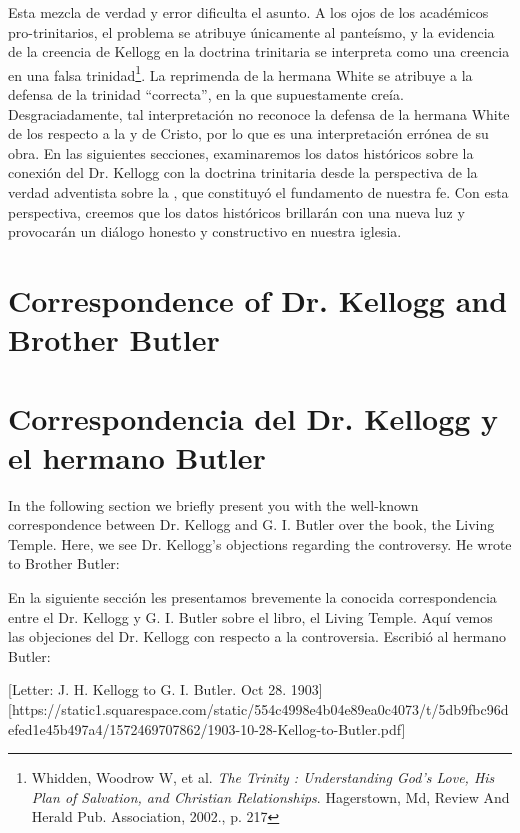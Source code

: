 Esta mezcla de verdad y error dificulta el asunto. A los ojos de los académicos pro-trinitarios, el problema se atribuye únicamente al panteísmo, y la evidencia de la creencia de Kellogg en la doctrina trinitaria se interpreta como una creencia en una falsa trinidad\footnote{Whidden, Woodrow W, et al. \textit{The Trinity : Understanding God's Love, His Plan of Salvation, and Christian Relationships}. Hagerstown, Md, Review And Herald Pub. Association, 2002., p. 217}. La reprimenda de la hermana White se atribuye a la defensa de la trinidad “correcta”, en la que supuestamente creía. Desgraciadamente, tal interpretación no reconoce la defensa de la hermana White de los  respecto a la  y de Cristo, por lo que es una interpretación errónea de su obra. En las siguientes secciones, examinaremos los datos históricos sobre la conexión del Dr. Kellogg con la doctrina trinitaria desde la perspectiva de la verdad adventista sobre la , que constituyó el fundamento de nuestra fe. Con esta perspectiva, creemos que los datos históricos brillarán con una nueva luz y provocarán un diálogo honesto y constructivo en nuestra iglesia.


\section*{Correspondence of Dr. Kellogg and Brother Butler}


\section*{Correspondencia del Dr. Kellogg y el hermano Butler}


In the following section we briefly present you with the well-known correspondence between Dr. Kellogg and G. I. Butler over the book, the Living Temple. Here, we see Dr. Kellogg’s objections regarding the controversy. He wrote to Brother Butler:


En la siguiente sección les presentamos brevemente la conocida correspondencia entre el Dr. Kellogg y G. I. Butler sobre el libro, el Living Temple. Aquí vemos las objeciones del Dr. Kellogg con respecto a la controversia. Escribió al hermano Butler:


[Letter: J. H. Kellogg to G. I. Butler. Oct 28. 1903][https://static1.squarespace.com/static/554c4998e4b04e89ea0c4073/t/5db9fbc96defed1e45b497a4/1572469707862/1903-10-28-Kellog-to-Butler.pdf]


